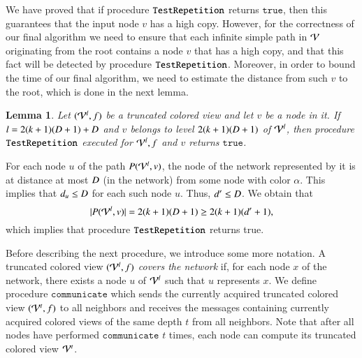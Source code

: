 \documentclass[a4paper,10pt]{article}
\newtheorem{lemma}{Lemma}[section]
\newcommand{\view}[1][]{\if!#1!\mathcal{V}\else\mathcal{V}^{#1}\fi}
\newcommand{\viewPath}[3][]{\if!#1! P(#2,#3)\else P(#2,#1,#3)\fi}  \newcommand{\ourColor}{\alpha}
\newcommand{\card}[1]{|#1|}
\newcommand{\algorithmTest}{\textup{\texttt{TestRepetition}}}
\newcommand{\returnTrue}{\texttt{true}}
\newcommand{\communicate}{\texttt{communicate}}
\newenvironment{proof}[1][Proof]
{\par\noindent{\bf #1:} }{\hspace*{\fill}\nolinebreak{$\Box$}\bigskip\par}
\begin{document}
We have proved that if procedure $\algorithmTest$ returns $\returnTrue$, then this guarantees that the input node $v$ has a high copy.
However, for the correctness of our final algorithm we need to ensure that each infinite simple path in $\view$ originating from the root contains a node $v$ that has a high copy, and that this fact will be detected by procedure $\algorithmTest$.
Moreover, in order to bound the time of our final algorithm, we need to estimate the distance from such $v$ to the root, which is done in the next lemma.
\begin{lemma} \label{lem:test:finite}
Let $(\view[l],f)$ be a truncated colored view and let $v$ be a node in it.
If $l=2(k+1)(D+1)+D$ and $v$ belongs to level $2(k+1)(D+1)$ of $\view[l]$, then procedure $\algorithmTest$ executed for $\view[l],f$ and $v$ returns $\returnTrue$.
\end{lemma}
\begin{proof}
For each node $u$ of the path $\viewPath{\view[l]}{v}$, the node of the network represented by it is at distance at most $D$ (in the network) from some node with color $\ourColor$.
This implies that $d_u\leq D$ for each such node $u$.
Thus, $d'\leq D$.
We obtain that
\[\card{\viewPath{\view[l]}{v}} = 2(k+1)(\diam+1) \geq 2(k+1)(d'+1),\]
which implies that procedure $\algorithmTest$ returns true.
\end{proof}




\medskip
Before describing the next procedure, we introduce some more notation.
A truncated colored view $(\view[l],f)$ \emph{covers the network} if, for each node $x$ of the network, there exists a node $u$ of $\view[l]$ such that $u$ represents $x$.
We define procedure $\communicate$ which sends the currently acquired truncated colored view $(\view[t],f)$ to all neighbors and receives the messages containing currently acquired colored views of the same depth $t$ from all neighbors.
Note that after all nodes have performed $\communicate$ $t$ times, each node can compute its truncated colored view $\view[t]$.
\end{document}
